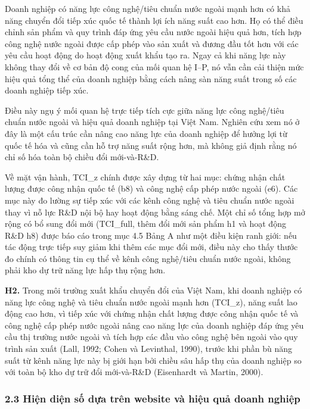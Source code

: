 \documentclass[12pt,a4paper]{article}
\begin{document}
Doanh nghiệp có năng lực công nghệ/tiêu chuẩn nước ngoài mạnh hơn có khả
năng chuyển đổi tiếp xúc quốc tế thành lợi ích năng suất cao hơn. Họ có
thể điều chỉnh sản phẩm và quy trình đáp ứng yêu cầu nước ngoài hiệu quả
hơn, tích hợp công nghệ nước ngoài được cấp phép vào sản xuất và đương
đầu tốt hơn với các yêu cầu hoạt động do hoạt động xuất khẩu tạo ra.
Ngay cả khi năng lực này không thay đổi về cơ bản độ cong của mối quan
hệ I--P, nó vẫn cần cải thiện mức hiệu quả tổng thể của doanh nghiệp
bằng cách nâng sàn năng suất trong số các doanh nghiệp tiếp xúc.

Điều này ngụ ý mối quan hệ trực tiếp tích cực giữa năng lực công
nghệ/tiêu chuẩn nước ngoài và hiệu quả doanh nghiệp tại Việt Nam. Nghiên
cứu xem nó ở đây là một cấu trúc cần nâng cao năng lực của doanh nghiệp
để hưởng lợi từ quốc tế hóa và cũng cần hỗ trợ năng suất rộng hơn, mà
không giả định rằng nó chỉ số hóa toàn bộ chiều đổi mới-và-R\&D.

Về mặt vận hành, TCI\_z chính được xây dựng từ hai mục: chứng nhận chất
lượng được công nhận quốc tế (b8) và công nghệ cấp phép nước ngoài (e6).
Các mục này đo lường sự tiếp xúc với các kênh công nghệ và tiêu chuẩn
nước ngoài thay vì nỗ lực R\&D nội bộ hay hoạt động bằng sáng chế. Một
chỉ số tổng hợp mở rộng có bổ sung đổi mới (TCI\_full, thêm đổi mới sản
phẩm h1 và hoạt động R\&D h8) được báo cáo trong mục 4.5 Bảng A như một
điều kiện ranh giới: nếu tác động trực tiếp suy giảm khi thêm các mục
đổi mới, điều này cho thấy thước đo chính có thông tin cụ thể về kênh
công nghệ/tiêu chuẩn nước ngoài, không phải kho dự trữ năng lực hấp thụ
rộng hơn.

\textbf{H2.} Trong môi trường xuất khẩu chuyển đổi của Việt Nam, khi
doanh nghiệp có năng lực công nghệ và tiêu chuẩn nước ngoài mạnh hơn
(TCI\_z), năng suất lao động cao hơn, vì tiếp xúc với chứng nhận chất
lượng được công nhận quốc tế và công nghệ cấp phép nước ngoài nâng cao
năng lực của doanh nghiệp đáp ứng yêu cầu thị trường nước ngoài và tích
hợp các đầu vào công nghệ bên ngoài vào quy trình sản xuất (Lall, 1992;
Cohen và Levinthal, 1990), trước khi phần bù năng suất từ kênh năng lực
này bị giới hạn bởi chiều sâu hấp thụ của doanh nghiệp so với toàn bộ
kho dự trữ đổi mới-và-R\&D (Eisenhardt và Martin, 2000).

\hypertarget{23-hiux1ec7n-diux1ec7n-sux1ed1-dux1ef1a-truxean-website-vuxe0-hiux1ec7u-quux1ea3-doanh-nghiux1ec7p}{%
\subsubsection{2.3 Hiện diện số dựa trên website và hiệu quả doanh
nghiệp}\label{23-hiux1ec7n-diux1ec7n-sux1ed1-dux1ef1a-truxean-website-vuxe0-hiux1ec7u-quux1ea3-doanh-nghiux1ec7p}}
\end{document}
